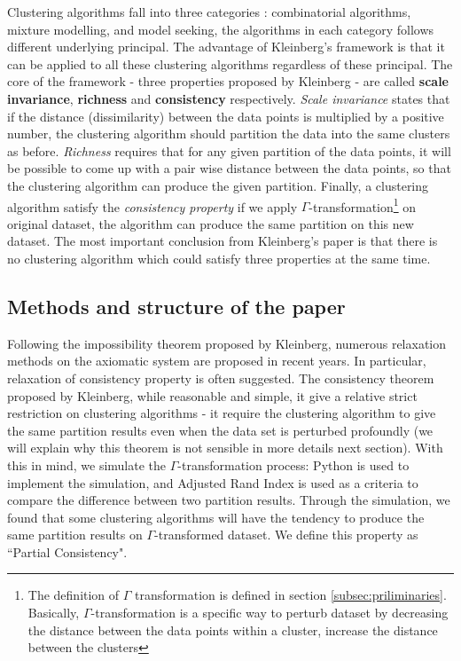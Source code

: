 \documentclass{uonmathreport}
\begin{document}
Clustering algorithms fall into three categories \cite{esl}: combinatorial algorithms, mixture modelling, and model seeking, the algorithms in each category follows different underlying principal. The advantage of Kleinberg's framework is that it can be applied to all these clustering algorithms regardless of these principal. The core of the framework - three properties proposed by Kleinberg - are called \textbf{scale invariance}, \textbf{richness} and \textbf{consistency} respectively. \textit{Scale invariance} states that if the distance (dissimilarity) between the data points is multiplied by a positive number, the clustering algorithm should partition the data into the same clusters as before. \textit{Richness} requires that for any given partition of the data points, it will be possible to come up with a pair wise distance between the data points, so that the clustering algorithm can produce the given partition. Finally, a clustering algorithm satisfy the \textit{consistency property} if we apply $\Gamma$-transformation\footnote{The definition of $\Gamma$ transformation is defined in section \ref{subsec:priliminaries}. Basically, $\Gamma$-transformation is a specific way to perturb dataset by decreasing the distance between the data points within a cluster, increase the distance between the clusters} on original dataset, the algorithm can produce the same partition on this new dataset. The most important conclusion from Kleinberg's paper is that there is no clustering algorithm which could satisfy three properties at the same time.

\subsection{Methods and structure of the paper}

Following the impossibility theorem proposed by Kleinberg, numerous relaxation methods on the axiomatic system are proposed in recent years. In particular, relaxation of consistency property is often suggested. The consistency theorem proposed by Kleinberg, while reasonable and simple, it give a relative strict restriction on clustering algorithms - it require the clustering algorithm to give the same partition results even when the data set is perturbed profoundly (we will explain why this theorem is not sensible in more details next section). With this in mind, we simulate the $\Gamma$-transformation process: Python is used to implement the simulation, and Adjusted Rand Index is used as a criteria to compare the difference between two partition results. Through the simulation, we found that some clustering algorithms will have the tendency to produce the same partition results on $\Gamma$-transformed dataset. We define this property as ``Partial Consistency". 
\end{document}

